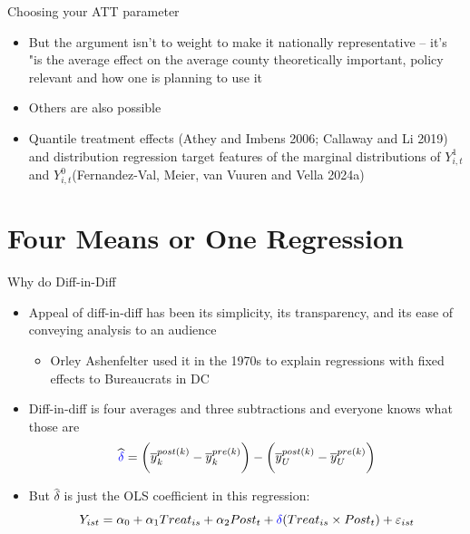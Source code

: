 \documentclass{beamer}
\begin{document}
\begin{frame}{Choosing your ATT parameter}

\begin{itemize}
\item But the argument isn't to weight to make it nationally representative -- it's "is the average effect on the average county theoretically important, policy relevant and how one is planning to use it
\item Others are also possible
\item Quantile treatment effects (Athey and Imbens 2006; Callaway and Li 2019) and distribution regression target features of the marginal distributions of $Y^1_{i,t}$ and $Y^0_{i,t}$(Fernandez-Val, Meier, van Vuuren and Vella 2024a)
\end{itemize}

\end{frame}

\section{Four Means or One Regression}




\begin{frame}{Why do Diff-in-Diff}

\begin{itemize}
\item Appeal of diff-in-diff has been its simplicity, its transparency, and its ease of conveying analysis to an audience 
	\begin{itemize}
	\item Orley Ashenfelter used it in the 1970s to explain regressions with fixed effects to Bureaucrats in DC 
	\end{itemize}
\item Diff-in-diff is four averages and three subtractions and everyone knows what those are
$$\widehat{\textcolor{blue}{\delta}} = \bigg ( \overline{y}_k^{post(k)} - \overline{y}_k^{pre(k)} \bigg ) - \bigg ( \overline{y}_U^{post(k)} - \overline{y}_U^{pre(k)} \bigg ) $$
\item But $\widehat{\delta}$ is just the OLS coefficient in this regression:
$$Y_{ist} = \alpha_0 + \alpha_1 Treat_{is} + \alpha_2 Post_{t} + \textcolor{blue}{\delta} (Treat_{is} \times Post_t) + \varepsilon_{ist} $$
\end{itemize}

\end{frame}
\end{document}
